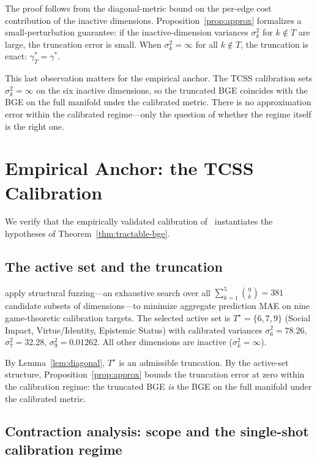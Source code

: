 \documentclass[11pt]{article}
\theoremstyle{definition}
\theoremstyle{remark}
\begin{document}
The proof follows from the diagonal-metric bound on the per-edge cost contribution of the inactive
dimensions. Proposition~\ref{prop:approx} formalizes a small-perturbation guarantee: if the
inactive-dimension variances $\sigma_k^2$ for $k \notin T$ are large, the truncation error is small.
When $\sigma_k^2 = \infty$ for all $k \notin T$, the truncation is exact: $\gamma_T^* = \gamma^*$.

This last observation matters for the empirical anchor. The TCSS calibration sets
$\sigma_k^2 = \infty$ on the six inactive dimensions, so the truncated BGE coincides with the BGE on
the full manifold under the calibrated metric. There is no approximation error within the calibrated
regime---only the question of whether the regime itself is the right one.


\section{Empirical Anchor: the TCSS Calibration}
\label{sec:empirical}

We verify that the empirically validated calibration of~\cite{bond2026tcss} instantiates the
hypotheses of Theorem~\ref{thm:tractable-bge}.

\subsection{The active set and the truncation}

\cite{bond2026tcss} apply structural fuzzing---an exhaustive search over all $\sum_{k=1}^{5}
\binom{9}{k} = 381$ candidate subsets of dimensions---to minimize aggregate prediction MAE on nine
game-theoretic calibration targets. The selected active set is $T^\star = \{6, 7, 9\}$
(Social Impact, Virtue/Identity, Epistemic Status) with calibrated variances $\sigma_6^2 = 78.26$,
$\sigma_7^2 = 32.28$, $\sigma_9^2 = 0.01262$. All other dimensions are inactive
($\sigma_k^2 = \infty$).

By Lemma~\ref{lem:diagonal}, $T^\star$ is an admissible truncation. By the active-set structure,
Proposition~\ref{prop:approx} bounds the truncation error at zero within the calibration regime: the
truncated BGE \emph{is} the BGE on the full manifold under the calibrated metric.

\subsection{Contraction analysis: scope and the single-shot calibration regime}
\end{document}
